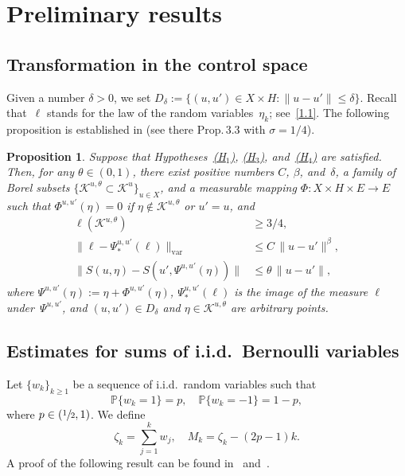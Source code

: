 \documentclass[11pt]{article}
\theoremstyle{plain}
\newtheorem{proposition}[theorem]{Proposition}
\theoremstyle{definition}
\let\mathcal\mathscr
\theoremstyle{plain}
\numberwithin{equation}{section}
\newcommand{\IP}{{\mathbb P}}
\newcommand{\KK}{{\mathcal K}}
\begin{document}
\section{Preliminary results}
\label{s2}

\subsection{Transformation in the control space}
Given a number $\delta>0$, we set $D_\delta:=\{(u,u')\in X\times H:\|u-u'\|\le\delta\}$. Recall that~$\ell$ stands for the law of the random variables~$\eta_k$; see~\eqref{1.1}. The following proposition is established in \cite[\S3.2]{KNS-2020} (see there Prop.\,3.3 with $\sigma=1/4$).

\begin{proposition}\label{P:2.5}
Suppose that Hypotheses~\hyperlink{H1}{\rm(H$_1$)}, \hyperlink{H3}{\rm(H$_3$)}, and~\hyperlink{H4}{\rm(H$_4$)} are satisfied. Then, for any $\theta\in(0,1)$, there exist positive numbers $C$, $\beta$, and~$\delta$, a family of Borel subsets $\{\KK^{u,\theta}\subset \KK^u\}_{u\in X}$, and a measurable mapping $\varPhi : X\times H \times E \to E$ such that $\varPhi^{u,u'}(\eta)=0$ if $\eta\notin \KK^{u,\theta}$ or $u'=u$, and
\begin{align}
\ell(\KK^{u,\theta})&\ge 3/4,
\label{3.7}\\
\|\ell-\varPsi_*^{u,u'}( \ell)\|_{\mathrm{var}}&\le C\, \|u-u'\|^\beta,
\label{3.8}\\
\|S(u,\eta)- S(u',\varPsi^{u,u'}(\eta))\| &\le \theta\, \|u-u'\|,
\label{3.9}
\end{align}
where $\varPsi^{u,u'}(\eta):=\eta+\varPhi^{u,u'}(\eta)$, $\varPsi_*^{u,u'}( \ell)$ is the image of the measure $\ell$ under~$\varPsi^{u,u'}$, and $(u,u')\in D_\delta$ and $\eta\in \KK^{u,\theta}$ are arbitrary points.
\end{proposition}

\subsection{Estimates for sums of i.i.d.\ Bernoulli variables}
\label{s2.1}
Let $\{w_k\}_{k\ge1}$ be a sequence of i.i.d.\ random variables such that
\[
\IP\{w_k=1\}=p, \quad \IP\{w_k=-1\}=1-p,
\]
where $p\in(\sfrac12,1)$. We define
\begin{equation}\label{2.2}
\zeta_k=\sum_{j=1}^kw_j, \quad M_k=\zeta_k-(2p-1)k.
\end{equation}
A proof of the following result can be found in~\cite[\S 12]{lamperti1996} and~\cite[\S XIV.2]{feller1968}.
\end{document}

